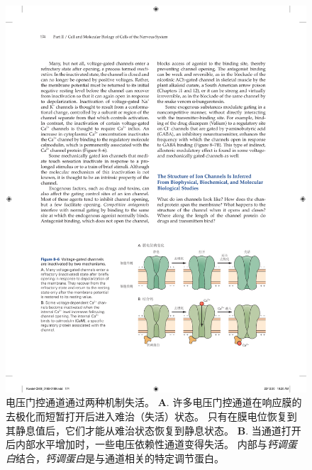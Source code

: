\begin{figure}[htbp]
	\centering
	\includegraphics[width=0.8\linewidth]{chap08/fig_8_6}
	\caption{电压门控通道通过两种机制失活。
		\textbf{A}. 许多电压门控通道在响应膜的去极化而短暂打开后进入难治（失活）状态。
		只有在膜电位恢复到其静息值后，它们才能从难治状态恢复到静息状态。
		\textbf{B}. 当通道打开后内部水平增加时，一些电压依赖性通道变得失活。
		内部与\textit{钙调蛋白}结合，\textit{钙调蛋白}是与通道相关的特定调节蛋白。}
	\label{fig:8_6}
\end{figure}


